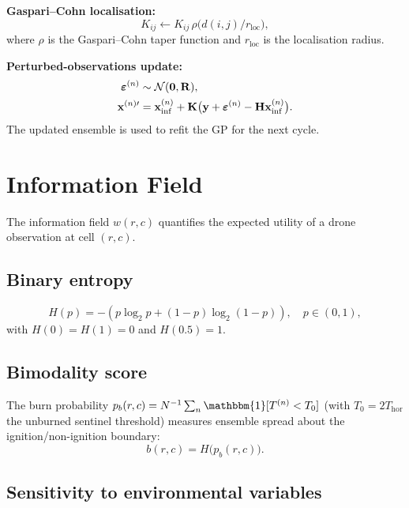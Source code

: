 \documentclass[11pt,twocolumn]{article}
\begin{document}
\textbf{Gaspari--Cohn localisation:}
\begin{equation}
  K_{ij} \leftarrow K_{ij}\,\rho\!\bigl(d(i,j)/r_{\mathrm{loc}}\bigr),\label{eq:gc}
\end{equation}
where $\rho$ is the Gaspari--Cohn taper function and $r_{\mathrm{loc}}$ is
the localisation radius.

\textbf{Perturbed-observations update:}
\begin{align}
  \boldsymbol{\varepsilon}^{(n)} &\sim \mathcal{N}(\mathbf{0},\mathbf{R}),\notag\\
  \mathbf{x}^{(n)\prime} &= \mathbf{x}_{\mathrm{inf}}^{(n)} +
    \mathbf{K}\bigl(\mathbf{y}+\boldsymbol{\varepsilon}^{(n)}-
    \mathbf{H}\mathbf{x}_{\mathrm{inf}}^{(n)}\bigr).\label{eq:enkfupdate}
\end{align}
The updated ensemble is used to refit the GP for the next cycle.

\section{Information Field}
\label{sec:information}

The information field $w(r,c)$ quantifies the expected utility of
a drone observation at cell $(r,c)$.

\subsection{Binary entropy}

\begin{equation}
  H(p) = -(p\log_2 p + (1-p)\log_2(1-p)),\quad
  p\in(0,1),\label{eq:Hbin}
\end{equation}
with $H(0)=H(1)=0$ and $H(0.5)=1$.

\subsection{Bimodality score}

The burn probability $p_b(r,c)=N^{-1}\sum_n\mathbbm{1}[T^{(n)}<T_0]$
(with $T_0=2T_{\mathrm{hor}}$ the unburned sentinel threshold)
measures ensemble spread about the ignition/non-ignition boundary:
\begin{equation}
  b(r,c) = H\!\bigl(p_b(r,c)\bigr).\label{eq:bimodal}
\end{equation}

\subsection{Sensitivity to environmental variables}
\end{document}
